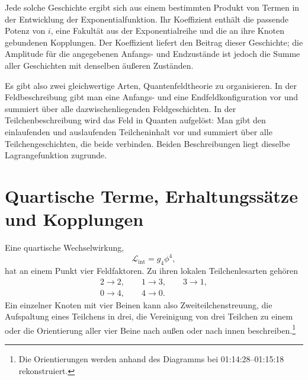 Jede solche Geschichte ergibt sich aus einem bestimmten Produkt von Termen in der Entwicklung der Exponentialfunktion. Ihr Koeffizient enthält die passende Potenz von \(i\), eine Fakultät aus der Exponentialreihe und die an ihre Knoten gebundenen Kopplungen. Der Koeffizient liefert den Beitrag dieser Geschichte; die Amplitude für die angegebenen Anfangs- und Endzustände ist jedoch die Summe aller Geschichten mit denselben äußeren Zuständen.

\begin{classroomqa}
\end{classroomqa}

Es gibt also zwei gleichwertige Arten, Quantenfeldtheorie zu organisieren. In der Feldbeschreibung gibt man eine Anfangs- und eine Endfeldkonfiguration vor und summiert über alle dazwischenliegenden Feldgeschichten. In der Teilchenbeschreibung wird das Feld in Quanten aufgelöst: Man gibt den einlaufenden und auslaufenden Teilcheninhalt vor und summiert über alle Teilchengeschichten, die beide verbinden. Beiden Beschreibungen liegt dieselbe Lagrangefunktion zugrunde.

\section{Quartische Terme, Erhaltungssätze und Kopplungen}

Eine quartische Wechselwirkung,
\begin{equation}
\mathcal{L}_{\mathrm{int}}=g_4\phi^4,
\end{equation}
hat an einem Punkt vier Feldfaktoren. Zu ihren lokalen Teilchenlesarten gehören
\begin{equation}
\begin{gathered}
2\longrightarrow2,
\qquad
1\longrightarrow3,
\qquad
3\longrightarrow1,\\
0\longrightarrow4,
\qquad
4\longrightarrow0.
\end{gathered}
\end{equation}
Ein einzelner Knoten mit vier Beinen kann also Zweiteilchenstreuung, die Aufspaltung eines Teilchens in drei, die Vereinigung von drei Teilchen zu einem oder die Orientierung aller vier Beine nach außen oder nach innen beschreiben.\footnote{Die Orientierungen werden anhand des Diagramms bei 01:14:28--01:15:18 rekonstruiert.}

